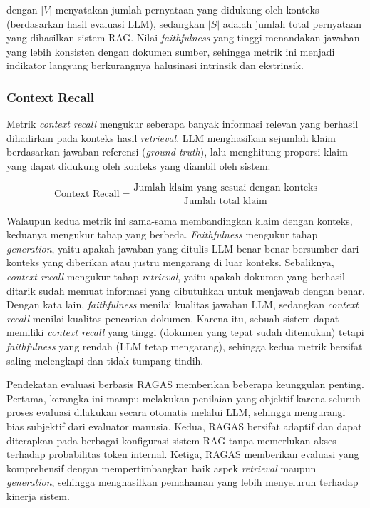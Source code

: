 dengan $|V|$ menyatakan jumlah pernyataan yang didukung oleh konteks (berdasarkan hasil evaluasi LLM), sedangkan $|S|$ adalah jumlah total pernyataan yang dihasilkan sistem RAG. Nilai \textit{faithfulness} yang tinggi menandakan jawaban yang lebih konsisten dengan dokumen sumber, sehingga metrik ini menjadi indikator langsung berkurangnya halusinasi intrinsik dan ekstrinsik.

\subsubsection{Context Recall}

Metrik \textit{context recall} mengukur seberapa banyak informasi relevan yang berhasil dihadirkan pada konteks hasil \textit{retrieval}. LLM menghasilkan sejumlah klaim berdasarkan jawaban referensi (\textit{ground truth}), lalu menghitung proporsi klaim yang dapat didukung oleh konteks yang diambil oleh sistem:

\begin{equation}
\text{Context Recall} = \frac{\text{Jumlah klaim yang sesuai dengan konteks}}{\text{Jumlah total klaim}}
\end{equation}

Walaupun kedua metrik ini sama-sama membandingkan klaim dengan konteks, keduanya mengukur tahap yang berbeda. \textit{Faithfulness} mengukur tahap \textit{generation}, yaitu apakah jawaban yang ditulis LLM benar-benar bersumber dari konteks yang diberikan atau justru mengarang di luar konteks. Sebaliknya, \textit{context recall} mengukur tahap \textit{retrieval}, yaitu apakah dokumen yang berhasil ditarik sudah memuat informasi yang dibutuhkan untuk menjawab dengan benar. Dengan kata lain, \textit{faithfulness} menilai kualitas jawaban LLM, sedangkan \textit{context recall} menilai kualitas pencarian dokumen. Karena itu, sebuah sistem dapat memiliki \textit{context recall} yang tinggi (dokumen yang tepat sudah ditemukan) tetapi \textit{faithfulness} yang rendah (LLM tetap mengarang), sehingga kedua metrik bersifat saling melengkapi dan tidak tumpang tindih.

Pendekatan evaluasi berbasis RAGAS memberikan beberapa keunggulan penting. Pertama, kerangka ini mampu melakukan penilaian yang objektif karena seluruh proses evaluasi dilakukan secara otomatis melalui LLM, sehingga mengurangi bias subjektif dari evaluator manusia. Kedua, RAGAS bersifat adaptif dan dapat diterapkan pada berbagai konfigurasi sistem RAG tanpa memerlukan akses terhadap probabilitas token internal. Ketiga, RAGAS memberikan evaluasi yang komprehensif dengan mempertimbangkan baik aspek \textit{retrieval} maupun \textit{generation}, sehingga menghasilkan pemahaman yang lebih menyeluruh terhadap kinerja sistem.

